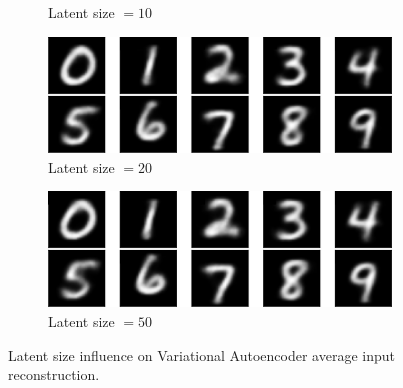\begin{figure}[h]
\begin{subfigure}[b]{0.47\textwidth}
         \caption{Latent size $=10$}
     \end{subfigure}
     \par\bigskip
     \begin{subfigure}[b]{0.47\textwidth}
         \centering
         \includegraphics[width=\textwidth]{observational/img/vae/vae_AVG_ls20.png}
         \caption{Latent size $=20$}
     \end{subfigure} 
     \hfill
     \begin{subfigure}[b]{0.47\textwidth}
         \centering
         \includegraphics[width=\textwidth]{observational/img/vae/vae_AVG_ls50.png}
         \caption{Latent size $=50$}
     \end{subfigure}
     \caption[Latent size influence on VAE average input reconstruction]{Latent size influence on Variational Autoencoder average input reconstruction.}
    \label{fig:vae-latent-recon}
\end{figure}
